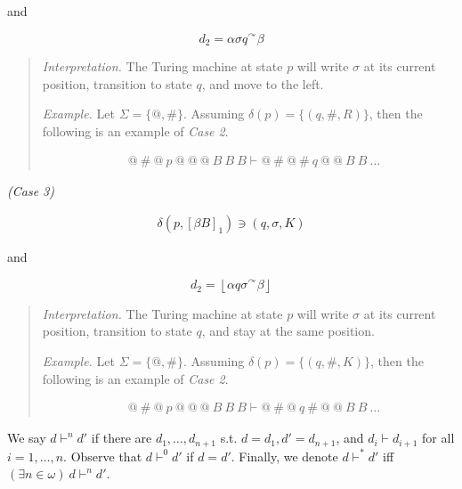\documentclass[a4paper, 12pt]{article}
\begin{document}
and 

$$d_2 = \alpha \sigma q {}^{\curvearrowright} \beta $$

\small 
\begin{quote}
    \textit{Interpretation.} The Turing machine at state $p$ will write $\sigma$
    at its current position, transition to state $q$, and move to the left. 

    \textit{Example.} Let $\Sigma = \{ @, \#\}$. Assuming $\delta (p) = \{ (q,
    \#, R) \}$, then the following is an example of
    \textit{Case 2}.
    
    \begin{align*}
        &@ ~ \# ~ @ ~ p ~ @ ~ @ ~ @ ~ B ~ B ~ B \vdash  @ ~ \# ~@ ~ \# ~ q ~ @ ~
        @~ B ~ B
        ~ \ldots
    \end{align*}
\end{quote}
\normalsize 


\textit{(Case 3)} 

\begin{align*}
    \delta \left( p, \left[ \beta B \right]_1  \right) \ni (q, \sigma, K)
\end{align*}

and 

$$d_2 = \left\lfloor \alpha q \sigma {}^{\curvearrowright} \beta  \right\rfloor $$

\small 
\begin{quote}
    \textit{Interpretation.} The Turing machine at state $p$ will write $\sigma$
    at its current position, transition to state $q$, and stay at the same
    position.

    \textit{Example.} Let $\Sigma = \{ @, \#\}$. Assuming $\delta (p) = \{ (q,
    \#, K) \}$, then the following is an example of
    \textit{Case 2}.
    
    \begin{align*}
        &@ ~ \# ~ @ ~ p ~ @ ~ @ ~ @ ~ B ~ B ~ B \vdash  @ ~ \# ~@ ~ q ~ \# ~  @ ~
        @~ B ~ B
        ~ \ldots
    \end{align*}
\end{quote}
\normalsize 

We say $d \vdash^n d'$ if there are $d_1, \ldots, d_{n+1}$ s.t. $d = d_1, d' =
d_{n+1}$, and $d_i \vdash d_{i + 1}$ for all $i = 1, \ldots, n$. Observe that $d
\vdash^0 d'$ if $d = d'$. Finally, we denote $d \vdash^{*} d'$ iff $(\exists n
\in \omega) ~ d \vdash^n d'$.
\end{document}
